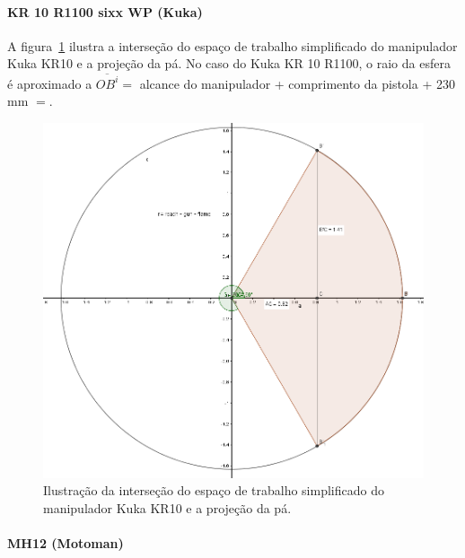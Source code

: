 \paragraph{KR 10 R1100 sixx WP (Kuka)}
A figura~\ref{fig::kukageom} ilustra a interseção do espaço de trabalho
simplificado do manipulador Kuka KR10 e a projeção da pá. No
caso do Kuka KR 10 R1100, o raio da esfera é aproximado a $\overline{OB^i} = $
alcance do manipulador + comprimento da pistola + 230 mm $= $. 

\begin{figure}[h!]	
	\includegraphics[width=\columnwidth]{figs/bighatch/kukageom.jpg}
	\caption{Ilustração da interseção do espaço de trabalho simplificado do
	manipulador Kuka KR10 e a projeção da pá.}
	\label{fig::kukageom}
\end{figure}

\paragraph{MH12 (Motoman)}

